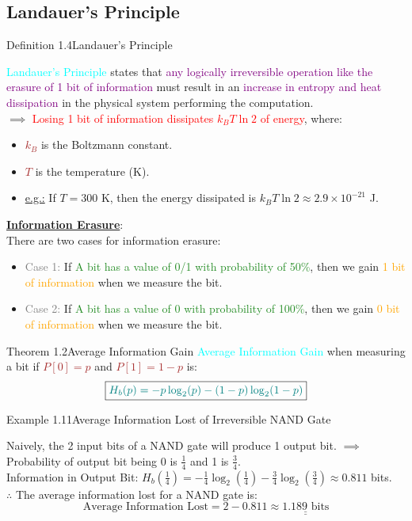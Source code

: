 \documentclass{book}
\begin{document}
\subsection{Landauer's Principle}
\begin{defBox}{Definition 1.4}{Landauer's Principle}
    \raggedright
    \textcolor{cyan}{Landauer's Principle} states that \textcolor{purple}{any logically irreversible operation like the erasure of 1 bit of information} must result in an \textcolor{purple}{increase in entropy and heat dissipation} in the physical system performing the computation.\\
    $\implies$ \textcolor{red}{Losing 1 bit of information dissipates \(k_BT \ln 2\) of energy}, where:
    \begin{itemize}
        \item \textcolor{brown}{\(k_B\)} is the Boltzmann constant.
        \item \textcolor{brown}{\(T\)} is the temperature (K).
    \end{itemize}
\end{defBox}
\begin{itemize}
    \item \uline{e.g.:} If $T = 300$ K, then the energy dissipated is \(k_BT \ln 2 \approx 2.9 \times 10^{-21}\) J.
\end{itemize}
\uline{\textbf{Information Erasure}}:\\
There are two cases for information erasure:
\begin{itemize}
    \item \textcolor{gray}{Case 1:} If \textcolor{forestgreen}{A bit has a value of 0/1 with probability of 50\%}, then we gain \textcolor{orange}{1 bit of information} when we measure the bit.
    \item \textcolor{gray}{Case 2:} If \textcolor{forestgreen}{A bit has a value of 0 with probability of 100\%}, then we gain \textcolor{orange}{0 bit of information} when we measure the bit.
\end{itemize}
\begin{thmBox}{Theorem 1.2}{Average Information Gain}
    \textcolor{cyan}{Average Information Gain} when measuring a bit if \textcolor{brown}{\(P[0] = p\)} and \textcolor{brown}{\(P[1] = 1 - p\)} is:
    \[
    \boxed{\textcolor{teal}{H_b(p) = -p \log_2(p) - (1 - p) \log_2(1 - p)}}
    \]
\end{thmBox}
\begin{egBox}{Example 1.11}{Average Information Lost of Irreversible NAND Gate}
    \raggedright
    Naively, the 2 input bits of a NAND gate will produce 1 output bit. $\implies$ Probability of output bit being 0 is $\frac{1}{4}$ and 1 is $\frac{3}{4}$.\\
    \vspace{1mm}
    Information in Output Bit: $H_b\left(\frac{1}{4}\right) = -\frac{1}{4} \log_2\left(\frac{1}{4}\right) - \frac{3}{4} \log_2\left(\frac{3}{4}\right) \approx 0.811$ bits.\\
    \vspace{1mm}
    $\therefore$ The average information lost for a NAND gate is:
    \[
    \text{Average Information Lost} = 2 - 0.811 \approx \underline{\underline{1.189 \text{ bits}}}
    \]
\end{egBox}
\end{document}
